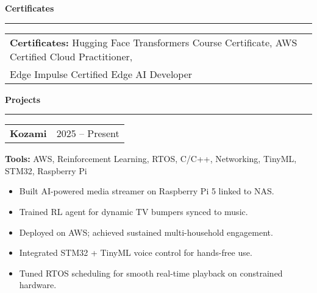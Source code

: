 \documentclass[a4paper,10pt]{article}
\begin{document}
\vspace{0.1in}
\textbf{Certificates}
\vspace{0.05in}
\hrule
\vspace{0.15in}

\begin{tabularx}{\textwidth}{@{}X@{}}
\noindent\textbf{Certificates:} Hugging Face Transformers Course Certificate, AWS Certified Cloud Practitioner,\\ Edge Impulse Certified Edge AI Developer
\end{tabularx}

\vspace{0.1in}
\textbf{Projects}
\vspace{0.05in}
\hrule
\vspace{0.05in}

\begin{tabularx}{\textwidth}{@{} X r @{}}
\textbf{Kozami} & 2025 -- Present \\
\end{tabularx}
\vspace{-4pt}
\noindent\textbf{Tools:} AWS, Reinforcement Learning, RTOS, C/C++, Networking, TinyML, STM32, Raspberry Pi
\vspace{0.1in}
\begin{itemize}[leftmargin=*, nosep]
  \item Built AI-powered media streamer on Raspberry Pi 5 linked to NAS.
  \item Trained RL agent for dynamic TV bumpers synced to music.
  \item Deployed on AWS; achieved sustained multi-household engagement.
  \item Integrated STM32 + TinyML voice control for hands-free use.
  \item Tuned RTOS scheduling for smooth real-time playback on constrained hardware.
\end{itemize}


\newpage

\vspace{-2pt}


\end{document}
